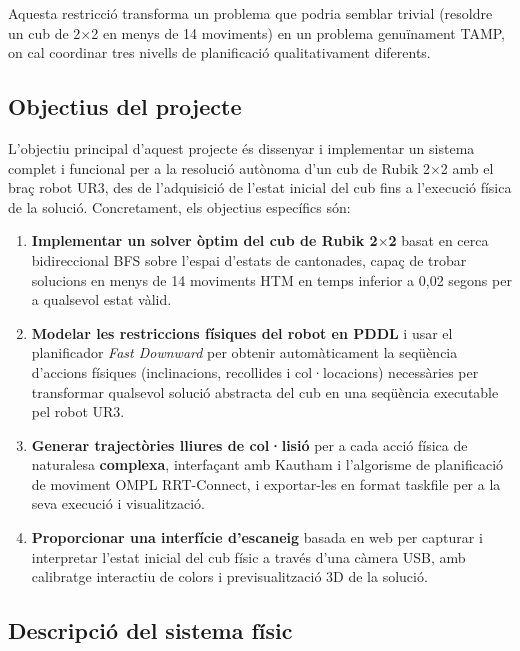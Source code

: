 \documentclass[12pt, a4paper]{article}
\begin{document}
Aquesta restricció transforma un problema que podria semblar trivial (resoldre un cub de 2$\times$2 en menys de 14 moviments) en un problema genuïnament TAMP, on cal coordinar tres nivells de planificació qualitativament diferents.

\subsection{Objectius del projecte}

L'objectiu principal d'aquest projecte és dissenyar i implementar un sistema complet i funcional per a la resolució autònoma d'un cub de Rubik 2$\times$2 amb el braç robot UR3, des de l'adquisició de l'estat inicial del cub fins a l'execució física de la solució. Concretament, els objectius específics són:

\begin{enumerate}[leftmargin=2em, label=\textbf{\arabic*.}]
  \item \textbf{Implementar un solver òptim del cub de Rubik 2$\times$2} basat en cerca bidireccional BFS sobre l'espai d'estats de cantonades, capaç de trobar solucions en menys de 14 moviments HTM en temps inferior a 0{,}02 segons per a qualsevol estat vàlid.

  \item \textbf{Modelar les restriccions físiques del robot en PDDL} i usar el planificador \textit{Fast Downward} per obtenir automàticament la seqüència d'accions físiques (inclinacions, recollides i col·locacions) necessàries per transformar qualsevol solució abstracta del cub en una seqüència executable pel robot UR3.

  \item \textbf{Generar trajectòries lliures de col·lisió} per a cada acció física de naturalesa \textbf{complexa}, interfaçant amb Kautham i l'algorisme de planificació de moviment OMPL RRT-Connect, i exportar-les en format taskfile per a la seva execució i visualització.

  \item \textbf{Proporcionar una interfície d'escaneig} basada en web per capturar i interpretar l'estat inicial del cub físic a través d'una càmera USB, amb calibratge interactiu de colors i previsualització 3D de la solució.

\end{enumerate}

\subsection{Descripció del sistema físic}
\end{document}
